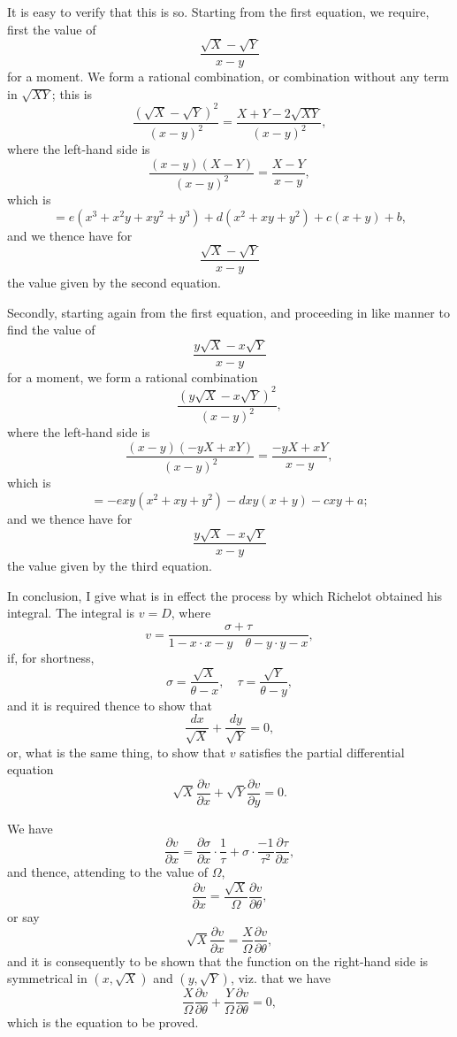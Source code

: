 \documentclass[11pt,a4paper]{book}
\begin{document}
{{{It is easy to verify that this is so. Starting from the first equation, we require, first the value of
\[
\frac{\sqrt{X}-\sqrt{Y}}{x-y}
\]
for a moment. We form a rational combination, or combination without any term in $\sqrt{XY}$; this is
\[
\frac{(\sqrt{X}-\sqrt{Y})^2}{(x-y)^2} = \frac{X+Y-2\sqrt{XY}}{(x-y)^2},
\]
where the left-hand side is
\[
\frac{(x-y)(X-Y)}{(x-y)^2} = \frac{X-Y}{x-y},
\]
which is
\[
= e(x^3+x^2y+xy^2+y^3) + d(x^2+xy+y^2) + c(x+y) + b,
\]
and we thence have for
\[
\frac{\sqrt{X}-\sqrt{Y}}{x-y}
\]
the value given by the second equation.

Secondly, starting again from the first equation, and proceeding in like manner to find the value of
\[
\frac{y\sqrt{X}-x\sqrt{Y}}{x-y}
\]
for a moment, we form a rational combination
\[
\frac{(y\sqrt{X}-x\sqrt{Y})^2}{(x-y)^2},
\]
where the left-hand side is
\[
\frac{(x-y)(-yX+xY)}{(x-y)^2} = \frac{-yX+xY}{x-y},
\]
which is
\[
= -exy(x^2+xy+y^2) - dxy(x+y) - cxy + a;
\]
and we thence have for
\[
\frac{y\sqrt{X}-x\sqrt{Y}}{x-y}
\]
the value given by the third equation.

In conclusion, I give what is in effect the process by which Richelot obtained his integral. The integral is $v=D$, where
\[
v = \frac{\sigma + \tau}{1-x\cdot x-y\quad \theta-y\cdot y-x},
\]
if, for shortness,
\[
\sigma = \frac{\sqrt{X}}{\theta-x}, \quad \tau = \frac{\sqrt{Y}}{\theta-y},
\]
and it is required thence to show that
\[
\frac{dx}{\sqrt{X}} + \frac{dy}{\sqrt{Y}} = 0,
\]
or, what is the same thing, to show that $v$ satisfies the partial differential equation
\[
\sqrt{X}\frac{\partial v}{\partial x} + \sqrt{Y}\frac{\partial v}{\partial y} = 0.
\]

We have
\[
\frac{\partial v}{\partial x} = \frac{\partial\sigma}{\partial x}\cdot\frac{1}{\tau} + \sigma\cdot\frac{-1}{\tau^2}\frac{\partial\tau}{\partial x},
\]
and thence, attending to the value of $\Omega$,
\[
\frac{\partial v}{\partial x} = \frac{\sqrt{X}}{\Omega}\frac{\partial v}{\partial\theta},
\]
or say
\[
\sqrt{X}\frac{\partial v}{\partial x} = \frac{X}{\Omega}\frac{\partial v}{\partial\theta},
\]
and it is consequently to be shown that the function on the right-hand side is symmetrical in $(x,\sqrt{X})$ and $(y,\sqrt{Y})$, viz. that we have
\[
\frac{X}{\Omega}\frac{\partial v}{\partial\theta} + \frac{Y}{\Omega}\frac{\partial v}{\partial\theta} = 0,
\]
which is the equation to be proved.

\newpage
}}}
\end{document}
